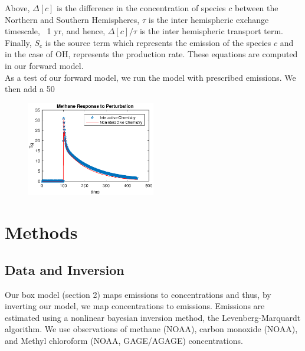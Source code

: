 \documentclass[two column,grl]{AGUTeX}
\begin{document}
\begin{article}
Above, $\Delta[c]$ is the difference in the concentration of species $c$ between the Northern and Southern Hemispheres, $\tau$ is the inter hemispheric exchange timescale, ~1 yr, and hence, $\Delta[c]/\tau$ is the inter hemispheric transport term. Finally, $S_c$ is the source term which represents the emission of the species $c$ and in the case of OH, represents the production rate. These equations are computed in our forward model. \\

As a test of our forward model, we run the model with prescribed emissions. We then add a 50%

\begin{figure} \label{forward_model}
\begin{center}
\includegraphics[width=0.5\textwidth]{forward_model_test.eps}
\end{center}
\end{figure}



\section{Methods}
\subsection{Data and Inversion}
Our box model (section 2) maps emissions to concentrations and thus, by inverting our model, we map concentrations to emissions. Emissions are estimated using a nonlinear bayesian inversion method, the Levenberg-Marquardt algorithm. We use observations of methane (NOAA), carbon monoxide (NOAA), and Methyl chloroform (NOAA, GAGE/AGAGE) concentrations.


\end{article}
\end{document}
